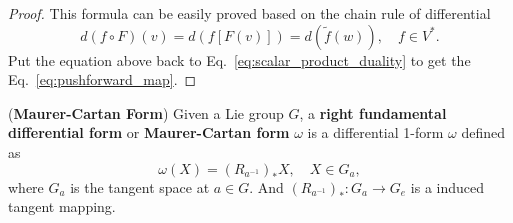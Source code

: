 \begin{proof}
This formula can be easily proved based on the chain rule of differential
\begin{equation*}
d(f\circ F)(v) = d(f[F(v)])=d(\tilde{f}(w)),\quad f\in V^*.
\end{equation*}
Put the equation above back to Eq.~\ref{eq:scalar_product_duality} to get the Eq.~\ref{eq:pushforward_map}.
\end{proof}


\begin{definition}(\textbf{Maurer-Cartan Form})
Given a Lie group $G$, a \textbf{right fundamental differential form} or \textbf{Maurer-Cartan form} $\omega$ is a differential 1-form $\omega$ defined as
\begin{equation}
\omega(X) = (R_{a^{-1}})_*X,  \quad X\in G_a,
\end{equation}
where $G_a$ is the tangent space at $a\in G$. And $(R_{a^{-1}})_*:G_a\to G_e$ is a induced tangent mapping.
\end{definition}


